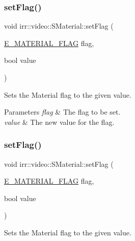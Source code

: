 \subsubsection{\texorpdfstring{set\+Flag()}{setFlag()}\hspace{0.1cm}{\footnotesize\ttfamily [1/2]}}
{\footnotesize\ttfamily void irr\+::video\+::\+S\+Material\+::set\+Flag (\begin{DoxyParamCaption}\item[{\hyperlink{namespaceirr_1_1video_a8a3bc00ae8137535b9fbc5f40add70d3}{E\+\_\+\+M\+A\+T\+E\+R\+I\+A\+L\+\_\+\+F\+L\+AG}}]{flag,  }\item[{bool}]{value }\end{DoxyParamCaption})\hspace{0.3cm}{\ttfamily [inline]}}



Sets the Material flag to the given value. 


\begin{DoxyParams}{Parameters}
{\em flag} & The flag to be set. \\
\hline
{\em value} & The new value for the flag. \\
\hline
\end{DoxyParams}
\mbox{\label{classirr_1_1video_1_1SMaterial_a460db947d8e2022c6be895b77a65bbda}} 
\subsubsection{\texorpdfstring{set\+Flag()}{setFlag()}\hspace{0.1cm}{\footnotesize\ttfamily [2/2]}}
{\footnotesize\ttfamily void irr\+::video\+::\+S\+Material\+::set\+Flag (\begin{DoxyParamCaption}\item[{\hyperlink{namespaceirr_1_1video_a8a3bc00ae8137535b9fbc5f40add70d3}{E\+\_\+\+M\+A\+T\+E\+R\+I\+A\+L\+\_\+\+F\+L\+AG}}]{flag,  }\item[{bool}]{value }\end{DoxyParamCaption})\hspace{0.3cm}{\ttfamily [inline]}}



Sets the Material flag to the given value. 


